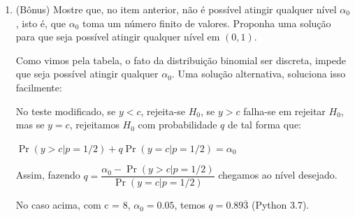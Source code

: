 \documentclass[a4paper,10pt, notitlepage]{report}
\newcommand{\pr}{\operatorname{Pr}} %
\begin{document}
\begin{enumerate}
	
	
	
	
	\item (Bônus) Mostre que, no item anterior, não é possível atingir qualquer nível $\alpha_0$, isto é, que $\alpha_0$ toma um número finito de valores.
	Proponha uma solução para que seja possível atingir qualquer nível em $(0, 1)$.
	
	\citep{degroot2012probability_random} Como vimos pela tabela, o fato da distribuição binomial ser discreta, impede que seja possível atingir qualquer $\alpha_0$. Uma solução alternativa, soluciona isso facilmente:
	
	No teste modificado, se $y<c$, rejeita-se $H_0$, se $y>c$ falha-se em rejeitar $H_0$, mas se $y=c$, rejeitamos $H_0$ com probabilidade $q$ de tal forma que:
	
	$\pr(y>c|p=1/2)+q\pr(y=c|p=1/2)=\alpha_0$
	
	Assim, fazendo $q=\dfrac{\alpha_0-\pr(y>c|p=1/2)}{\pr(y=c|p=1/2)}$ chegamos ao nível desejado.
	
	No caso acima, com c = 8, $\alpha_0=0.05$, temos $q=0.89\overline{3}$ (Python 3.7).
	
	\end{enumerate}
	
	
	
	
	
	
	
	
	
	\newpage
	 
	 
	
\end{document}
